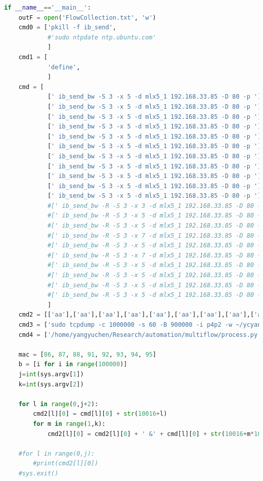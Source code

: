 \documentclass[12pt,a4paper]{article}
\begin{document}
\begin{lstlisting}[language=Python]
if __name__=='__main__':
    outF = open('FlowCollection.txt', 'w')
    cmd0 = ['pkill -f ib_send',
            #'sudo ntpdate ntp.ubuntu.com'
            ]
    cmd1 = [
            'define',
            ]
    cmd = [
            [' ib_send_bw -S 3 -x 5 -d mlx5_1 192.168.33.85 -D 80 -p '],
            [' ib_send_bw -S 3 -x 5 -d mlx5_1 192.168.33.85 -D 80 -p '],
            [' ib_send_bw -S 3 -x 5 -d mlx5_1 192.168.33.85 -D 80 -p '],
            [' ib_send_bw -S 3 -x 5 -d mlx5_1 192.168.33.85 -D 80 -p '],
            [' ib_send_bw -S 3 -x 5 -d mlx5_1 192.168.33.85 -D 80 -p '],
            [' ib_send_bw -S 3 -x 5 -d mlx5_1 192.168.33.85 -D 80 -p '],
            [' ib_send_bw -S 3 -x 5 -d mlx5_1 192.168.33.85 -D 80 -p '],
            [' ib_send_bw -S 3 -x 5 -d mlx5_1 192.168.33.85 -D 80 -p '],
            [' ib_send_bw -S 3 -x 5 -d mlx5_1 192.168.33.85 -D 80 -p '],
            [' ib_send_bw -S 3 -x 5 -d mlx5_1 192.168.33.85 -D 80 -p '],
            [' ib_send_bw -S 3 -x 5 -d mlx5_1 192.168.33.85 -D 80 -p '],
            #[' ib_send_bw -R -S 3 -x 3 -d mlx5_1 192.168.33.85 -D 80 -p '],
            #[' ib_send_bw -R -S 3 -x 5 -d mlx5_1 192.168.33.85 -D 80 -p '],
            #[' ib_send_bw -R -S 3 -x 5 -d mlx5_1 192.168.33.85 -D 80 -p '],
            #[' ib_send_bw -R -S 3 -x 7 -d mlx5_1 192.168.33.85 -D 80 -p '],
            #[' ib_send_bw -R -S 3 -x 5 -d mlx5_1 192.168.33.85 -D 80 -p '],
            #[' ib_send_bw -R -S 3 -x 7 -d mlx5_1 192.168.33.85 -D 80 -p '],
            #[' ib_send_bw -R -S 3 -x 5 -d mlx5_1 192.168.33.85 -D 80 -p '],
            #[' ib_send_bw -R -S 3 -x 5 -d mlx5_1 192.168.33.85 -D 80 -p '],
            #[' ib_send_bw -R -S 3 -x 5 -d mlx5_1 192.168.33.85 -D 80 -p '],
            #[' ib_send_bw -R -S 3 -x 5 -d mlx5_1 192.168.33.85 -D 80 -p '],
            ]
    cmd2 = [['aa'],['aa'],['aa'],['aa'],['aa'],['aa'],['aa'],['aa'],['aa'],['aa'],['aa'],['aa'],['aa'],['aa'],['aa'],['aa'],['aa'],['aa'],['aa'],['aa'],['aa']]
    cmd3 = ['sudo tcpdump -c 1000000 -s 60 -B 900000 -i p4p2 -w ~/ycyang/result.pcap']
    cmd4 = ['/home/yangyuchen/Research/automation/multiflow/process.py ']

    mac = [86, 87, 88, 91, 92, 93, 94, 95]
    b = [i for i in range(100000)]
    j=int(sys.argv[1])
    k=int(sys.argv[2])

    for l in range(0,j+2):
        cmd2[l][0] = cmd[l][0] + str(10016+l)
        for m in range(1,k):
            cmd2[l][0] = cmd2[l][0] + ' &' + cmd[l][0] + str(10016+m*10+l)

    #for l in range(0,j):
        #print(cmd2[l][0])
    #sys.exit()



\end{lstlisting}
\end{document}
